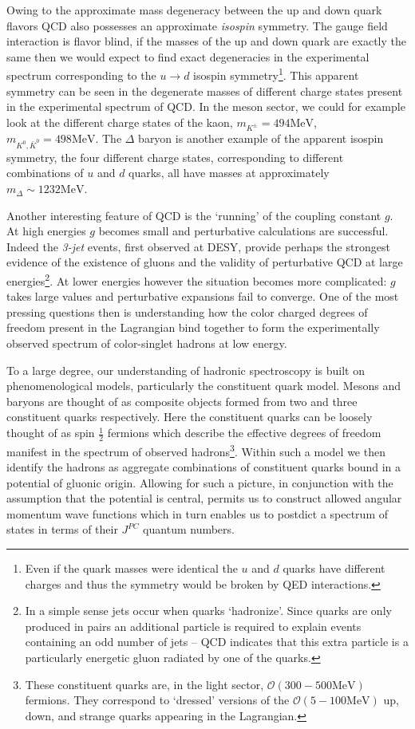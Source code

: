 Owing to the approximate mass degeneracy between the up and down quark flavors QCD also possesses an approximate \emph{isospin} symmetry. The gauge field interaction is flavor blind, if the masses of the up and down quark are exactly the same then we would expect to find exact degeneracies in the experimental spectrum corresponding to the $u\rightarrow d$ isospin symmetry\footnote{Even if the quark masses were identical the $u$ and $d$ quarks have different charges and thus the symmetry would be broken by QED interactions. }. This apparent symmetry can be seen in the degenerate masses of different charge states present in the experimental spectrum of QCD. In the meson sector, we could for example look at the different charge states of the kaon, $m_{K^\pm}  = 494 \mathrm{MeV}$, $m_{K^0,\bar{K}^0} = 498 \mathrm{MeV}$.  The $\Delta$ baryon is another example of the apparent isospin symmetry, the four different charge states, corresponding to different combinations of $u$ and $d$ quarks, all have masses at approximately $m_\Delta \sim 1232 \mathrm{MeV}$. 

Another interesting feature of QCD is the `running' of the coupling constant $g$. At high energies $g$ becomes small and perturbative calculations are successful. Indeed the \emph{3-jet} events, first observed at DESY, provide perhaps the strongest evidence of the existence of gluons and the validity of perturbative QCD at large energies\footnote{In a simple sense jets occur when quarks `hadronize'. Since quarks are only produced in pairs an additional particle is required to explain events containing an odd number of jets -- QCD indicates that this extra particle is a particularly energetic gluon radiated by one of the quarks.}. At lower energies however the situation becomes more complicated: $g$ takes large values and perturbative expansions fail to converge. One of the most pressing questions then is understanding how the color charged degrees of freedom present in the Lagrangian bind together to form the experimentally observed spectrum of color-singlet hadrons at low energy. 

To a large degree, our understanding of hadronic spectroscopy is built on phenomenological models, particularly the constituent quark model. Mesons and baryons are thought of as composite objects formed from two and three constituent quarks respectively. Here the constituent quarks can be loosely thought of as spin $\tfrac{1}{2}$ fermions which describe the effective degrees of freedom manifest in the spectrum of observed hadrons\footnote{These constituent quarks are, in the light sector, $\mathcal{O}(300-500\mathrm{MeV})$ fermions. They correspond to `dressed' versions of the $\mathcal{O}(5-100\mathrm{MeV})$ up, down, and strange quarks appearing in the Lagrangian.}. Within such a model we then identify the hadrons as aggregate combinations of constituent quarks bound in a potential of gluonic origin. Allowing for such a picture, in conjunction with the assumption that the potential is central, permits us to construct allowed angular momentum wave functions which in turn enables us to postdict a spectrum of states in terms of their $J^{PC}$ quantum numbers.

